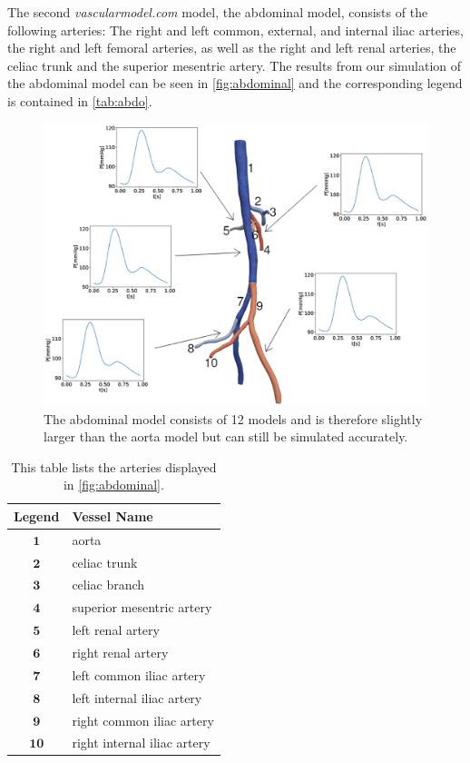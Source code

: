 \documentclass[a4paper, oneside]{discothesis}
\begin{document}
The second \emph{vascularmodel.com} model, the abdominal model, consists of the following arteries: 
The right and left common, external, and internal iliac arteries, the right and left femoral arteries, as well as the right and left renal arteries, the celiac trunk and the superior mesentric artery.
The results from our simulation of the abdominal model can be seen in \autoref{fig:abdominal} and the corresponding legend is contained in \autoref{tab:abdo}.
\begin{figure} [!ht]
	\centering
	\includegraphics[width=0.8\columnwidth]{figures/0029.eps}
	\caption{The abdominal model consists of 12 models and is therefore slightly larger than the aorta model but can still be simulated accurately.}
	\label{fig:abdominal}
\end{figure}
\begin{table}[!ht]
	\begin{center}
		\begin{tabular}{|c|l|}
			\hline
			Legend & Vessel Name\\
			\hline
			$\mathbf{1}$& aorta \\ 
			$\mathbf{2}$& celiac trunk \\
			$\mathbf{3}$& celiac branch \\
			$\mathbf{4}$& superior mesentric artery \\
			$\mathbf{5}$& left renal artery \\
			$\mathbf{6}$& right renal artery \\
			$\mathbf{7}$& left common iliac artery \\
			$\mathbf{8}$& left internal iliac artery \\
			$\mathbf{9}$& right common iliac artery \\
			$\mathbf{10}$& right internal iliac artery \\
			\hline
		\end{tabular}
	\end{center}
	\caption{This table lists the arteries displayed in \autoref{fig:abdominal}.}
	\label{tab:abdo}
\end{table}
\end{document}
